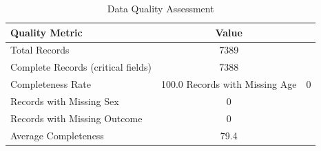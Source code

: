 \begin{table}[htbp]

\caption{Data Quality Assessment}
\label{tab:data_quality}
\begin{tabular}{lc}

\toprule

Quality Metric & Value \\

\midrule

Total Records & 7389 \\
Complete Records (critical fields) & 7388 \\
Completeness Rate & 100.0%
Records with Missing Age & 0 \\
Records with Missing Sex & 0 \\
Records with Missing Outcome & 0 \\
Average Completeness & 79.4%

\bottomrule

\end{tabular}

\end{table}